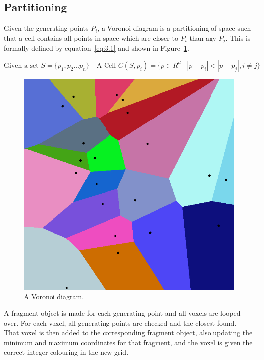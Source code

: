 \subsection{Partitioning}

Given the generating points $P_i$, a Voronoi diagram is a partitioning of space such that a cell contains all points in space which are closer to $P_i$ than any $P_j$. This is formally defined by equation~\ref{eq:3.1} and shown in Figure~\ref{fig:3.4}.

\begin{equation}
\text{Given a set } S=\{p_1, p_2\dotsc p_n\} \quad \text{A Cell } C(S,p_i)=\{p\in R^d\mid |p-p_i|<|p-p_j|, i\neq j\}
\label{eq:3.1}
\end{equation}

\begin{figure}
\centerline{\includegraphics[scale=0.25]{VoronoiEx.png}}
\caption{A Voronoi diagram\cite{voronoipict}.}
\label{fig:3.4}
\end{figure}

A fragment object is made for each generating point and all voxels are looped over. For each voxel, all generating points are checked and the closest found. That voxel is then added to the corresponding fragment object, also updating the minimum and maximum coordinates for that fragment, and the voxel is given the correct integer colouring in the new grid.

